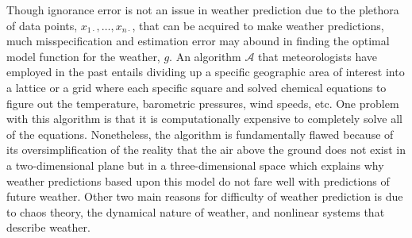 \documentclass[12pt]{article}
\begin{document}


\begin{enumerate}


\begin{tcolorbox}[colback = white, sharp corners]

Though ignorance error is not an issue in weather prediction due to the plethora of data points, $x_{1 \cdot}, \ldots, x_{n \cdot}$, that can be acquired to make weather predictions, much misspecification and estimation error may abound in finding the optimal model function for the weather, $g$. An algorithm $\mathcal{A}$ that meteorologists have employed in the past entails dividing up a specific geographic area of interest into a lattice or a grid where each specific square and solved chemical equations to figure out the temperature, barometric pressures, wind speeds, etc. One problem with this algorithm is that it is computationally expensive to completely solve all of the equations. Nonetheless, the algorithm is fundamentally flawed because of its oversimplification of the reality that the air above the ground does not exist in a two-dimensional plane but in a three-dimensional space which explains why weather predictions based upon this model do not fare well with predictions of future weather. Other two main reasons for difficulty of weather prediction is due to chaos theory, the dynamical nature of weather, and nonlinear systems that describe weather. 


\end{tcolorbox}
\end{enumerate}
\end{document}
